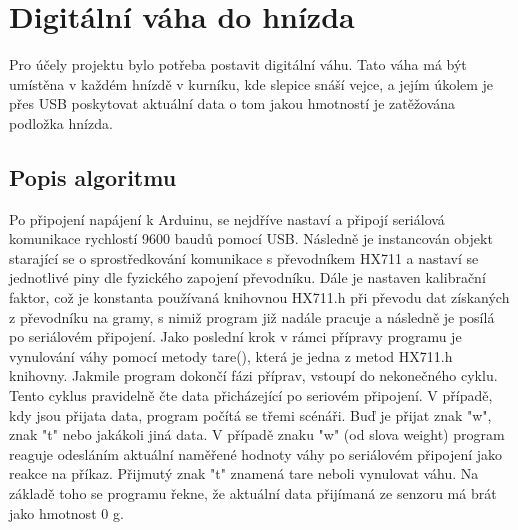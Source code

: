\section{Digitální váha do hnízda}\label{sec:digitalni-vaha-do-hnizda}
Pro účely projektu bylo potřeba postavit digitální váhu.
Tato váha má být umístěna v každém hnízdě v kurníku, kde slepice snáší vejce, a jejím úkolem je přes USB poskytovat aktuální data o tom jakou hmotností je zatěžována podložka hnízda.

\subsection*{Popis algoritmu}
Po připojení napájení k Arduinu, se nejdříve nastaví a připojí seriálová komunikace rychlostí 9600 baudů pomocí USB.
Následně je instancován objekt starající se o sprostředkování komunikace s převodníkem HX711 a nastaví se jednotlivé piny dle fyzického zapojení převodníku.
Dále je nastaven kalibrační faktor, což je konstanta používaná knihovnou HX711.h při převodu dat získaných z převodníku na gramy, s nimiž program již nadále pracuje a následně je posílá po seriálovém připojení.
Jako poslední krok v rámci přípravy programu je vynulování váhy pomocí metody tare(), která je jedna z metod HX711.h knihovny.
Jakmile program dokončí fázi příprav, vstoupí do nekonečného cyklu.
Tento cyklus pravidelně čte data přicházející po seriovém připojení.
V případě, kdy jsou přijata data, program počítá se třemi scénáři.
Buď je přijat znak "w", znak "t" nebo jakákoli jiná data.
V případě znaku "w" (od slova weight) program reaguje odesláním aktuální naměřené hodnoty váhy po seriálovém připojení jako reakce na příkaz.
Přijmutý znak "t" znamená tare neboli vynulovat váhu.
Na základě toho se programu řekne, že aktuální data přijímaná ze senzoru má brát jako hmotnost 0 g.


